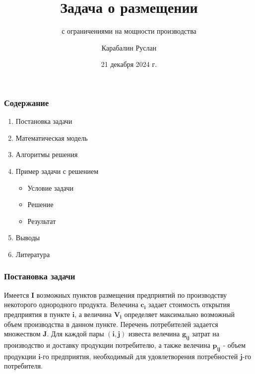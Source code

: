 \documentclass[12pt]{beamer}
\title{Задача о размещении}
\subtitle{с ограничениями на мощности производства}
\author{Карабалин Руслан}
\date{21 декабря 2024 г.}
\begin{document}
	
	\begin{frame}
		\titlepage
	\end{frame}

    \begin{frame}
        \frametitle{Содержание}

        \vspace{-2cm}

        \begin{enumerate}
            \item Постановка задачи
            \item Математическая модель
            \item Алгоритмы решения
            \item Пример задачи с решением
            \begin{itemize}
                \item Условие задачи
                \item Решение
                \item Результат
            \end{itemize}
            \item Выводы
            \item Литература
        \end{enumerate}

    \end{frame}

    \begin{frame}
        \frametitle{Постановка задачи}

        \vspace{-2cm}

        Имеется $\boldsymbol{I}$ возможных пунктов размещения предприятий
        по производству некоторого однородного продукта.
        Велечина $\boldsymbol{c_{i}}$ задает стоимость открытия предприятия
        в пункте $\boldsymbol{i}$, а величина $\boldsymbol{V_{i}}$ определяет максимально
        возможный объем производства в данном пункте.
        Перечень потребителей задается множеством $\boldsymbol{J}$.
        Для каждой пары $\boldsymbol{(i, j)}$ известа велечина $\boldsymbol{g_{ij}}$
        затрат на производство и доставку продукции потребителю,
        а также велечина $\boldsymbol{p_{ij}}$ - объем продукции $\boldsymbol{i}$-го предприятия,
        необходимый для удовлетворения потребностей
        $\boldsymbol{j}$-го потребителя.
        
    \end{frame}
\end{document}
